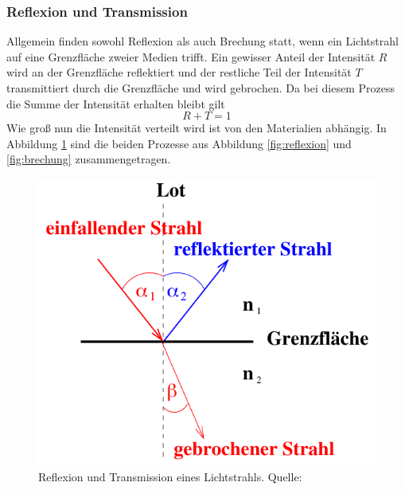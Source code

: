 \subsubsection*{Reflexion und Transmission}
\label{sec:RefTrans}
Allgemein finden sowohl Reflexion als auch Brechung statt, wenn ein Lichtstrahl auf eine Grenzfläche zweier
Medien trifft. Ein gewisser Anteil der Intensität $R$ wird an der Grenzfläche reflektiert und der restliche
Teil der Intensität $T$ transmittiert durch die Grenzfläche und wird gebrochen. Da bei diesem Prozess die
Summe der Intensität erhalten bleibt gilt
\begin{equation}
    R+T=1
\end{equation}
Wie groß nun die Intensität verteilt wird ist von den Materialien abhängig. In Abbildung \ref{fig:RefTrans}
sind die beiden Prozesse aus Abbildung \ref{fig:reflexion} und \ref{fig:brechung} zusammengetragen.
\begin{figure}[H]
    \centering
    \includegraphics[scale = 0.5]{pictures/ReflexionTransmission.png}
    \caption{Reflexion und Transmission eines Lichtstrahls. Quelle: \cite{AP01}}
    \label{fig:RefTrans}
\end{figure}

